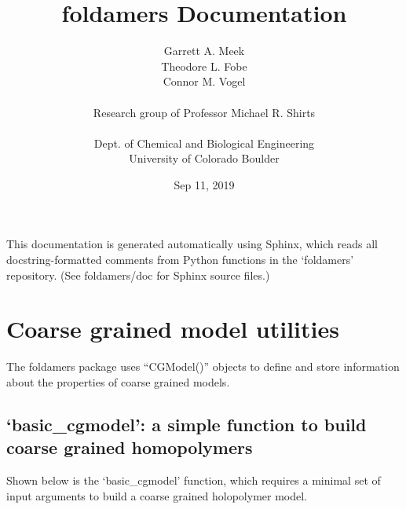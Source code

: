 \documentclass[letterpaper,12pt,english,openany,oneside]{sphinxmanual}
\title{foldamers Documentation}
\date{Sep 11, 2019}
\author{Garrett A. Meek\\Theodore L. Fobe\\Connor M. Vogel\\ \\Research group of Professor Michael R. Shirts\\ \\Dept. of Chemical and Biological Engineering\\University of Colorado Boulder}
\begin{document}
\pagestyle{empty}
\sphinxmaketitle
\pagestyle{plain}
\sphinxtableofcontents
\pagestyle{normal}
\label{\detokenize{index::doc}}


This documentation is generated automatically using Sphinx, which reads all docstring-formatted comments from Python functions in the ‘foldamers’ repository.  (See foldamers/doc for Sphinx source files.)


\chapter{Coarse grained model utilities}
\label{\detokenize{cg_model:coarse-grained-model-utilities}}\label{\detokenize{cg_model::doc}}
The foldamers package uses “CGModel()” objects to define and store information about the properties of coarse grained models.


\section{‘basic\_cgmodel’: a simple function to build coarse grained homopolymers}
\label{\detokenize{cg_model:basic-cgmodel-a-simple-function-to-build-coarse-grained-homopolymers}}
Shown below is the ‘basic\_cgmodel’ function, which requires a minimal set of input arguments to build a coarse grained holopolymer model.

\label{\detokenize{cg_model:module-cg_model.cgmodel}}
\end{document}
